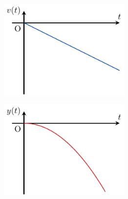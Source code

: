 \documentclass[../../main/main.tex]{subfiles}
\begin{document}
\hfill
\begin{minipage}{0.45\linewidth}
	\begin{center}
		\includegraphics[width=6.5cm]{nov_vy}
	\end{center}
\end{minipage}
\hfill
\begin{minipage}{0.45\linewidth}
	\begin{center}
		\includegraphics[width=6.5cm]{nov_y}
	\end{center}
\end{minipage}
\hfill~
\end{document}
